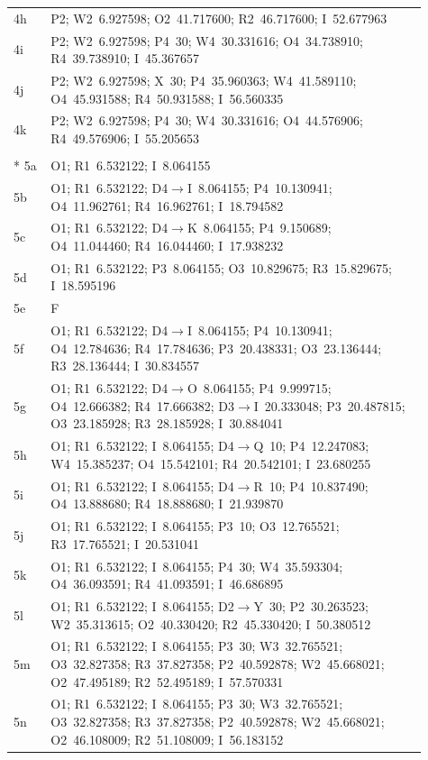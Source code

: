 \documentclass{swmcmthesis}
\begin{document}
\begin{longtable}{@{}l >{\raggedright\arraybackslash}p{0.91\linewidth}@{}}
    4h & P2; W2~6.927598; O2~41.717600; R2~46.717600; I~52.677963 \\
    4i & P2; W2~6.927598; P4~30; W4~30.331616; O4~34.738910; R4~39.738910; I~45.367657 \\
    4j & P2; W2~6.927598; X~30; P4~35.960363; W4~41.589110; O4~45.931588; R4~50.931588; I~56.560335 \\
    4k & P2; W2~6.927598; P4~30; W4~30.331616; O4~44.576906; R4~49.576906; I~55.205653 \\
    \addlinespace
    \multicolumn{2}{@{}l}{\textbf{Vehicle $V_5$}} \\*
    5a & O1; R1~6.532122; I~8.064155 \\
    5b & O1; R1~6.532122; D4$\to$I~8.064155; P4~10.130941; O4~11.962761; R4~16.962761; I~18.794582 \\
    5c & O1; R1~6.532122; D4$\to$K~8.064155; P4~9.150689; O4~11.044460; R4~16.044460; I~17.938232 \\
    5d & O1; R1~6.532122; P3~8.064155; O3~10.829675; R3~15.829675; I~18.595196 \\
    5e & F \\
    5f & O1; R1~6.532122; D4$\to$I~8.064155; P4~10.130941; O4~12.784636; R4~17.784636; P3~20.438331; O3~23.136444; R3~28.136444; I~30.834557 \\
    5g & O1; R1~6.532122; D4$\to$O~8.064155; P4~9.999715; O4~12.666382; R4~17.666382; D3$\to$I~20.333048; P3~20.487815; O3~23.185928; R3~28.185928; I~30.884041 \\
    5h & O1; R1~6.532122; I~8.064155; D4$\to$Q~10; P4~12.247083; W4~15.385237; O4~15.542101; R4~20.542101; I~23.680255 \\
    5i & O1; R1~6.532122; I~8.064155; D4$\to$R~10; P4~10.837490; O4~13.888680; R4~18.888680; I~21.939870 \\
    5j & O1; R1~6.532122; I~8.064155; P3~10; O3~12.765521; R3~17.765521; I~20.531041 \\
    5k & O1; R1~6.532122; I~8.064155; P4~30; W4~35.593304; O4~36.093591; R4~41.093591; I~46.686895 \\
    5l & O1; R1~6.532122; I~8.064155; D2$\to$Y~30; P2~30.263523; W2~35.313615; O2~40.330420; R2~45.330420; I~50.380512 \\
    5m & O1; R1~6.532122; I~8.064155; P3~30; W3~32.765521; O3~32.827358; R3~37.827358; P2~40.592878; W2~45.668021; O2~47.495189; R2~52.495189; I~57.570331 \\
    5n & O1; R1~6.532122; I~8.064155; P3~30; W3~32.765521; O3~32.827358; R3~37.827358; P2~40.592878; W2~45.668021; O2~46.108009; R2~51.108009; I~56.183152 \\
\end{longtable}
\end{document}
